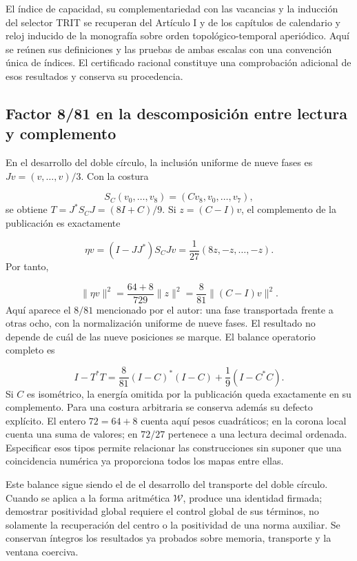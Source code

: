 El índice de capacidad, su complementariedad con las vacancias y la
inducción del selector TRIT se recuperan del Artículo I y de los
capítulos de calendario y reloj inducido de la monografía sobre orden
topológico-temporal aperiódico. Aquí se reúnen sus definiciones y las
pruebas de ambas escalas con una convención única de índices. El
certificado racional constituye una comprobación adicional de esos
resultados y conserva su procedencia.



\subsection{Factor 8/81 en la descomposición entre lectura y complemento}
En el desarrollo del doble círculo, la inclusión uniforme de nueve fases es \(Jv=(v,\ldots,v)/3\). Con la costura

\[
S_C(v_0,\ldots,v_8)=(Cv_8,v_0,\ldots,v_7),
\]
se obtiene \(T=J^*S_CJ=(8I+C)/9\). Si \(z=(C-I)v\), el complemento de la publicación es exactamente

\[
\eta v=(I-JJ^*)S_CJv=\frac1{27}(8z,-z,\ldots,-z).
\]
Por tanto,

\[
\|\eta v\|^2=\frac{64+8}{729}\|z\|^2
=\frac8{81}\|(C-I)v\|^2.
\]
Aquí aparece el \(8/81\) mencionado por el autor: una fase transportada frente a otras ocho, con la normalización uniforme de nueve fases. El resultado no depende de cuál de las nueve posiciones se marque. El balance operatorio completo es

\[
I-T^*T=\frac8{81}(I-C)^*(I-C)+\frac19(I-C^*C).
\]
Si \(C\) es isométrico, la energía omitida por la publicación queda exactamente en su complemento. Para una costura arbitraria se conserva además su defecto explícito. El entero \(72=64+8\) cuenta aquí pesos cuadráticos; en la corona local cuenta una suma de valores; en \(72/27\) pertenece a una lectura decimal ordenada. Especificar esos tipos permite relacionar las construcciones sin suponer que una coincidencia numérica ya proporciona todos los mapas entre ellas.

Este balance sigue siendo el de el desarrollo del transporte del doble círculo. Cuando se aplica a la forma aritmética \(\mathscr W\), produce una identidad firmada; demostrar positividad global requiere el control global de sus términos, no solamente la recuperación del centro o la positividad de una norma auxiliar. Se conservan íntegros los resultados ya probados sobre memoria, transporte y la ventana coerciva.

